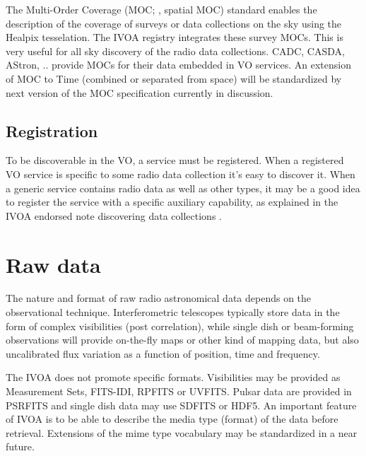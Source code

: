 \documentclass[11pt,a4paper]{ivoa}
\begin{document}
The Multi-Order Coverage (MOC; \cite{2019ivoa.spec.1007F}, spatial MOC) standard enables the description of the coverage of surveys or data collections on the sky using the Healpix tesselation. The IVOA registry integrates these survey MOCs. This is very useful for all sky discovery of the radio data collections. CADC, CASDA, AStron, .. provide MOCs for their data embedded in VO services. An extension of MOC to Time (combined or separated from space) will be standardized by next version of the MOC specification currently in discussion.

\subsection{Registration} 
To be discoverable in the VO, a service must be registered.
When a registered VO service is specific to some radio data collection it's easy to discover it. When a generic service contains radio data as well as other types, it may be a good idea to register the service with a specific auxiliary capability, as explained in the IVOA endorsed note discovering data collections \citep{2019ivoa.rept.0520D}.

\section{Raw data}
The nature and format of raw radio astronomical data 
depends on the observational technique. Interferometric telescopes typically store data in the form of complex visibilities (post correlation), while single dish or beam-forming observations will provide on-the-fly maps or other kind of mapping data, but also uncalibrated flux variation as a function of position, time and frequency. 

The IVOA does not promote specific formats. Visibilities may be provided as Measurement Sets, FITS-IDI, RPFITS or UVFITS. Pulsar data are provided in PSRFITS and single dish data may use SDFITS or HDF5. An important feature of IVOA is to be able to describe the media type (format) of the data before retrieval. Extensions of the mime type vocabulary may be standardized in a near future.  
\end{document}

